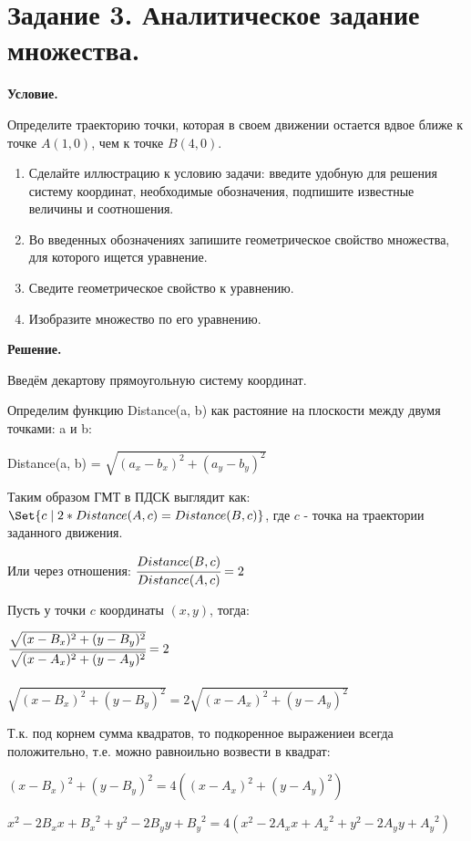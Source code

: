 \documentclass{article}
\author{Мемный Flicky }
\date{November 2023}
\begin{document}
\section{Задание 3. Аналитическое задание множества.}

\textbf{Условие.}

Определите траекторию точки, которая в своем движении остается вдвое ближе к
точке $A(1,0)$, чем к точке $B(4,0)$.

\begin{enumerate}
    \item Сделайте иллюстрацию к условию задачи: введите удобную для решения систему
координат, необходимые обозначения, подпишите известные величины и
соотношения.
    \item Во введенных обозначениях запишите геометрическое свойство множества, для
которого ищется уравнение.
    \item Сведите геометрическое свойство к уравнению.
    \item Изобразите множество по его уравнению.
\end{enumerate}
\vspace{10mm}
\textbf{Решение.}

Введём декартову прямоугольную систему координат.

Определим функцию Distance(a, b) как растояние на плоскости между двумя точками: a и b:

Distance(a, b) = $\sqrt{(a_x - b_x)^2 + (a_y - b_y)^2}$

Таким образом ГМТ в ПДСК выглядит как: $\Set{c \mid 2*Distance(A, c) = Distance(B, c)}$, где $c$ -  точка на траектории заданного движения.

Или через отношения: $\cfrac{Distance(B, c)}{Distance(A, c)} = 2$

Пусть у точки $c$ координаты $(x, y)$, тогда:

$\cfrac{\sqrt{(x-B_x)^2 + (y - B_y)^2}}{\sqrt{(x-A_x)^2 + (y-A_y)^2}} = 2$\\\\

$\sqrt{(x-B_x)^2 + (y - B_y)^2} = 2 \sqrt{(x-A_x)^2 + (y-A_y)^2}$

Т.к. под корнем сумма квадратов, то подкоренное выражениеи всегда положительно, т.е. можно равноильно возвести в квадрат:

$(x-B_x)^2 + (y - B_y)^2 = 4 ((x-A_x)^2 + (y-A_y)^2)$

$x^2 - 2B_xx + {B_x}^2 + y^2 - 2B_yy + {B_y}^2 = 4 (x^2 - 2A_xx + {A_x}^2 + y^2 - 2A_yy + {A_y}^2)$
\end{document}

